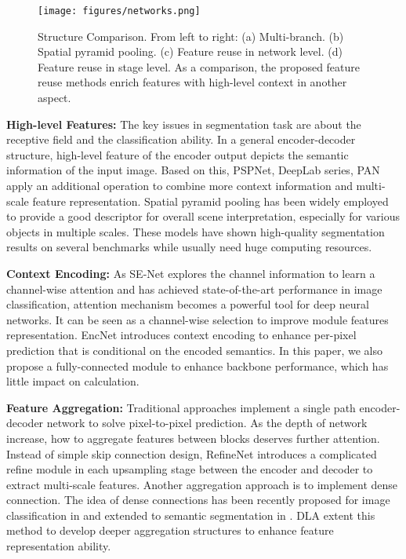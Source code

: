 \documentclass[10pt,twocolumn,letterpaper]{article}
\begin{document}
\begin{figure*}
\begin{center}
\texttt{[image: figures/networks.png]}
\end{center}
  \caption{Structure Comparison. From left to right: (a) Multi-branch. (b) Spatial pyramid pooling. (c) Feature reuse in network level. (d) Feature reuse in stage level. As a comparison, the proposed feature reuse methods enrich features with high-level context in another aspect. }
\label{fig:compare_aspp_pan_dfa}
\end{figure*}

\textbf{High-level Features:} 
The key issues in segmentation task are about the receptive field and the classification ability. In a general encoder-decoder structure, high-level feature of the encoder output depicts the semantic information of the input image. Based on this, PSPNet\cite{pspnet}, DeepLab series\cite{deeplabv3plus}\cite{deeplanv3}\cite{DeepLab2},  PAN\cite{pan} apply an additional operation to combine more context information and multi-scale feature representation. Spatial pyramid pooling has been widely employed to provide a good descriptor for overall scene interpretation, especially for various objects in multiple scales. These models have shown high-quality segmentation results on several benchmarks while usually need huge computing resources.


\textbf{Context Encoding:} 
As SE-Net\cite{senet} explores the channel information to learn a channel-wise attention and has achieved state-of-the-art performance in image classification, attention mechanism becomes a powerful tool for deep neural networks\cite{sca-cnn}. It can be seen as a channel-wise selection to improve module features representation. EncNet\cite{encnet}\cite{mnih2014recurrent}\cite{attentionseg} introduces context encoding to enhance per-pixel prediction that is conditional on the encoded semantics.  In this paper, we also propose a fully-connected module to enhance backbone performance, which has little impact on calculation.


\textbf{Feature Aggregation:} 
Traditional approaches implement a single path encoder-decoder network to solve pixel-to-pixel prediction. As the depth of network increase, how to aggregate features between blocks deserves further attention. 
Instead of simple skip connection design, RefineNet\cite{refinenet} introduces a complicated refine module in each upsampling stage between the encoder and decoder to extract multi-scale features. Another aggregation approach is to implement dense connection. The idea of dense connections has been recently proposed for image classification in \cite{DenseNet} and extended to semantic segmentation in \cite{fc-DenseNet} \cite{denseaspp}. DLA\cite{deeplayeraggre} extent this method to develop deeper aggregation structures to enhance feature representation ability.
\end{document}

